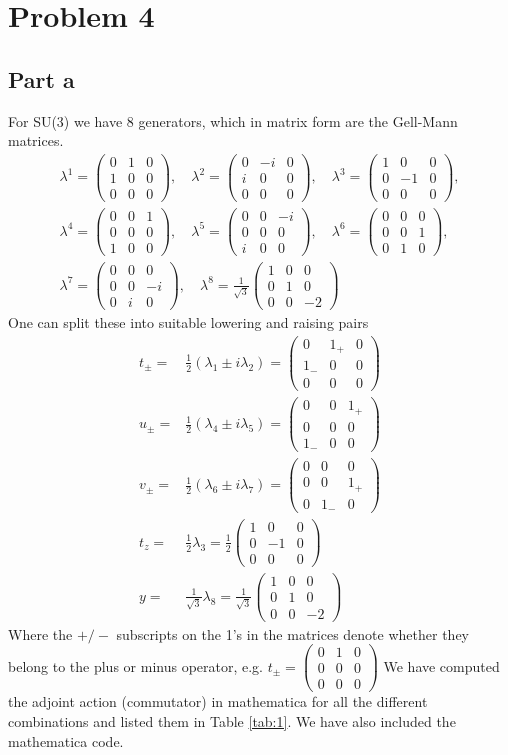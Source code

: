 \documentclass[a4paper,12pt]{article}
\newcommand\matthree[9]{%
	\begin{pmatrix}
		#1 & #2 & #3 \\ #4 & #5 & #6 \\ #7 & #8 & #9
	\end{pmatrix}%
}
\begin{document}
\section*{Problem 4}
\subsection*{Part a}
For SU(3) we have 8 generators, which in matrix form are the Gell-Mann matrices.
\begin{gather*}
	\lambda^1 = \matthree {0}{1}{0}{1}{0}{0}{0}{0}{0},\quad
	\lambda^2 = \matthree {0}{-i}{0}{i}{0}{0}{0}{0}{0},\quad
	\lambda^3 = \matthree {1}{0}{0}{0}{-1}{0}{0}{0}{0},\\[1ex]
	\lambda^4 = \matthree {0}{0}{1}{0}{0}{0}{1}{0}{0},\quad
	\lambda^5 = \matthree {0}{0}{-i}{0}{0}{0}{i}{0}{0},\quad
	\lambda^6 = \matthree {0}{0}{0}{0}{0}{1}{0}{1}{0},\\[1ex]
	\lambda^7 = \matthree {0}{0}{0}{0}{0}{-i}{0}{i}{0},\quad
	\lambda^8 = \frac{1}{\sqrt{3}} \matthree {1}{0}{0}{0}{1}{0}{0}{0}{-2}
\end{gather*}
One can split these into suitable lowering and raising pairs
\begin{equation}
	\begin{aligned}
		t_\pm=& \frac{1}{2}(\lambda_1\pm i\lambda_2)=
		\matthree {0}{1_+}{0}{1_-}{0}{0}{0}{0}{0}
		\\
		u_\pm=& \frac{1}{2}(\lambda_4\pm i\lambda_5)=
		\matthree {0}{0}{1_+}{0}{0}{0}{1_-}{0}{0}
		\\
		v_\pm=& \frac{1}{2}(\lambda_6\pm i\lambda_7)
		=
		\matthree {0}{0}{0}{0}{0}{1_+}{0}{1_-}{0}
				\\
		t_z=&\frac{1}{2}\lambda_3
			=\frac{1}{2}
		\matthree {1}{0}{0}{0}{-1}{0}{0}{0}{0}
		\\
		y=&\frac{1}{\sqrt{3}}\lambda_8
			=\frac{1}{\sqrt{3}}
		\matthree {1}{0}{0}{0}{1}{0}{0}{0}{-2}
	\end{aligned}
\end{equation}
Where the $+/-$ subscripts on the 1's in the matrices denote whether they belong to the plus or minus operator, e.g. $	t_\pm=
\matthree {0}{1}{0}{0}{0}{0}{0}{0}{0}$
We have computed the adjoint action (commutator) in mathematica for all the different combinations and listed them in Table \ref{tab:1}. We have also included the mathematica code.
\end{document}
